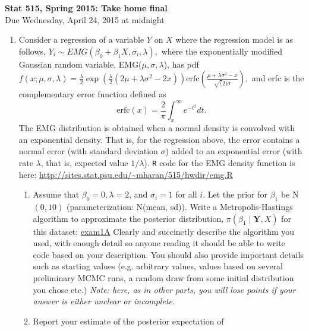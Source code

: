 \message{ !name(takehome15.tex)}\documentclass[11pt]{article}
\begin{document}

\begin{center}
\Large
{\bf  Stat 515, Spring 2015: Take home final}\\
Due Wednesday, April 24, 2015 at midnight\\
\normalsize
\end{center}
\begin{enumerate}
\item Consider a regression of a variable $Y$ on $X$ where the regression model is as follows,
$Y_i \sim EMG(\beta_0 + \beta_1X, \sigma_i, \lambda),$ 
where the exponentially modified Gaussian random variable, EMG($\mu, \sigma, \lambda$), has pdf
$f(x;\mu, \sigma, \lambda) = \frac{\lambda}{2} \exp(\frac{\lambda}{2} (2\mu + \lambda\sigma^2 - 2x)) \mbox{erfc}\left(\frac{\mu + \lambda\sigma^2 - x}{\sqrt(2) \sigma} \right), $
and erfc is the complementary error function defined as
$$\mbox{erfc}(x) = \frac{2}{\pi} \int_x^{\infty} e^{-t^2} dt.$$
The EMG distribution is obtained when a normal density is convolved
with an exponential density. That is, for the regression above, the
error contains a normal error (with standard deviation $\sigma$) added
to an exponential error (with rate $\lambda$, that is, expected value
$1/\lambda$). {\tt R} code for the EMG density function is here: \url{http://sites.stat.psu.edu/~mharan/515/hwdir/emg.R}
\begin{enumerate}
\item Assume that $\beta_0=0, \lambda=2$, and $\sigma_i=1 $ for all
  $i$. Let the prior for $\beta_1$ be N$(0,10)$ (parameterization:
  N(mean, sd)). Write a Metropolis-Hastings algorithm to approximate
  the posterior distribution, $\pi(\beta_1\mid {\mathbf Y, X})$ for
  this dataset: \url{exam1A} Clearly and succinctly describe the
  algorithm you used, with enough detail so anyone reading it should
  be able to write code based on your description. You should also
  provide important details such as starting values (e.g. arbitrary
  values, values based on several preliminary MCMC runs, a random draw
  from some initial distribution you chose etc.) {\it Note: here, as
    in other parts, you will lose points if your answer is either
    unclear or incomplete.}
\item Report your estimate of the posterior expectation of

\end{enumerate}
\end{enumerate}
\end{document}
